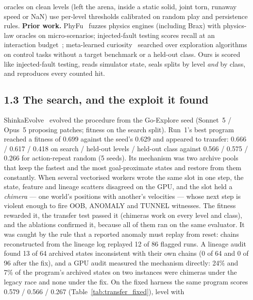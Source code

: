 oracles on clean levels (left the arena, inside a static solid, joint torn, runaway speed or NaN) use per-level thresholds calibrated on
random play and persistence rules. \textbf{Prior work.} PhyFu~\cite{phyfu} fuzzes physics engines (including Brax) with physics-law
oracles on micro-scenarios; injected-fault testing scores recall at an interaction budget~\cite{ariyurek-mcts,gbqa}; meta-learned
curiosity~\cite{alet} searched over exploration algorithms on control tasks without a target benchmark or a held-out class. Ours is scored
like injected-fault testing, reads simulator state, seals splits by level \emph{and} by class, and reproduces every counted hit.

\subsection*{1.3 The search, and the exploit it found}
ShinkaEvolve~\cite{shinka} evolved the procedure from the Go-Explore seed (Sonnet~5 / Opus~5 proposing patches; fitness on the search split).
Run~1's best program reached a fitness of 0.699 against the seed's 0.629 and appeared to transfer: 0.666 / 0.617 / 0.418 on search / held-out
levels / held-out class against 0.566 / 0.575 / 0.266 for action-repeat random (5 seeds). Its mechanism was two archive pools that keep the
fastest and the most goal-proximate states and restore from them constantly. When several vectorised workers wrote the same slot in one step,
the state, feature and lineage scatters disagreed on the GPU, and the slot held a \emph{chimera} --- one world's positions with another's
velocities --- whose next step is violent enough to fire OOB, ANOMALY and TUNNEL witnesses. The fitness rewarded it, the transfer test
passed it (chimeras work on every level and class), and the ablations confirmed it, because all of them ran on the same evaluator. It was
caught by the rule that a reported anomaly must replay from reset: chains reconstructed from the lineage log replayed 12 of 86 flagged
runs. A lineage audit found 13 of 64 archived states inconsistent with their own chains (0 of 64 and 0 of 96 after the fix), and a GPU
audit measured the mechanism directly: 24\% and 7\% of the program's archived states on two instances were chimeras under the legacy
race and none under the fix. On the fixed harness the same program scores 0.579 / 0.566 / 0.267 (Table~\ref{tab:transfer_fixed}), level with
